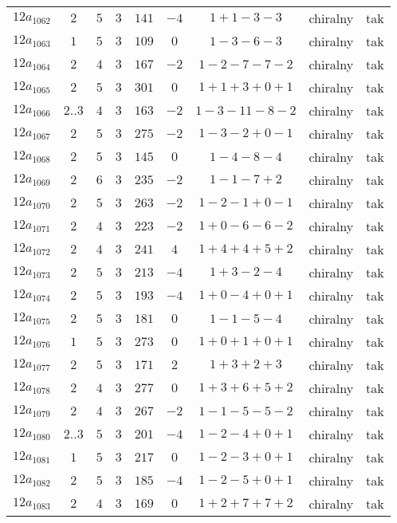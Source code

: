 \begin{longtable}{ccccccccc}
$12a_{1062}$ & $2$ & $5$ & $3$ & $141$ & $-4$ & $1+1-3-3$ & chiralny & tak \\
$12a_{1063}$ & $1$ & $5$ & $3$ & $109$ & $0$ & $1-3-6-3$ & chiralny & tak \\
$12a_{1064}$ & $2$ & $4$ & $3$ & $167$ & $-2$ & $1-2-7-7-2$ & chiralny & tak \\
$12a_{1065}$ & $2$ & $5$ & $3$ & $301$ & $0$ & $1+1+3+0+1$ & chiralny & tak \\
$12a_{1066}$ & $2..3$ & $4$ & $3$ & $163$ & $-2$ & $1-3-11-8-2$ & chiralny & tak \\
$12a_{1067}$ & $2$ & $5$ & $3$ & $275$ & $-2$ & $1-3-2+0-1$ & chiralny & tak \\
$12a_{1068}$ & $2$ & $5$ & $3$ & $145$ & $0$ & $1-4-8-4$ & chiralny & tak \\
$12a_{1069}$ & $2$ & $6$ & $3$ & $235$ & $-2$ & $1-1-7+2$ & chiralny & tak \\
$12a_{1070}$ & $2$ & $5$ & $3$ & $263$ & $-2$ & $1-2-1+0-1$ & chiralny & tak \\
$12a_{1071}$ & $2$ & $4$ & $3$ & $223$ & $-2$ & $1+0-6-6-2$ & chiralny & tak \\
$12a_{1072}$ & $2$ & $4$ & $3$ & $241$ & $4$ & $1+4+4+5+2$ & chiralny & tak \\
$12a_{1073}$ & $2$ & $5$ & $3$ & $213$ & $-4$ & $1+3-2-4$ & chiralny & tak \\
$12a_{1074}$ & $2$ & $5$ & $3$ & $193$ & $-4$ & $1+0-4+0+1$ & chiralny & tak \\
$12a_{1075}$ & $2$ & $5$ & $3$ & $181$ & $0$ & $1-1-5-4$ & chiralny & tak \\
$12a_{1076}$ & $1$ & $5$ & $3$ & $273$ & $0$ & $1+0+1+0+1$ & chiralny & tak \\
$12a_{1077}$ & $2$ & $5$ & $3$ & $171$ & $2$ & $1+3+2+3$ & chiralny & tak \\
$12a_{1078}$ & $2$ & $4$ & $3$ & $277$ & $0$ & $1+3+6+5+2$ & chiralny & tak \\
$12a_{1079}$ & $2$ & $4$ & $3$ & $267$ & $-2$ & $1-1-5-5-2$ & chiralny & tak \\
$12a_{1080}$ & $2..3$ & $5$ & $3$ & $201$ & $-4$ & $1-2-4+0+1$ & chiralny & tak \\
$12a_{1081}$ & $1$ & $5$ & $3$ & $217$ & $0$ & $1-2-3+0+1$ & chiralny & tak \\
$12a_{1082}$ & $2$ & $5$ & $3$ & $185$ & $-4$ & $1-2-5+0+1$ & chiralny & tak \\
$12a_{1083}$ & $2$ & $4$ & $3$ & $169$ & $0$ & $1+2+7+7+2$ & chiralny & tak \\

\end{longtable}
